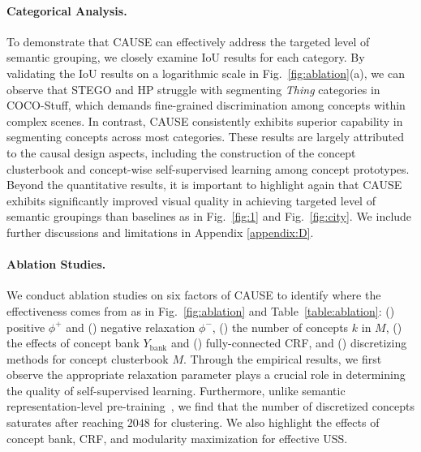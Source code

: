 \documentclass{article} \usepackage{iclr2024_conference,times}
\begin{document}
\paragraph{Categorical Analysis.} To demonstrate that CAUSE can effectively address the targeted level of semantic grouping, we closely examine IoU results for each category. By validating the IoU results on a logarithmic scale in Fig.~\ref{fig:ablation}(a), we can observe that STEGO and HP struggle with segmenting \textit{Thing} categories in COCO-Stuff, which demands fine-grained discrimination among concepts within complex scenes. In contrast, CAUSE consistently exhibits superior capability in segmenting concepts across most categories. These results are largely attributed to the causal design aspects, including the construction of the concept clusterbook and concept-wise self-supervised learning among concept prototypes. Beyond the quantitative results, it is important to highlight again that CAUSE exhibits significantly improved visual quality in achieving targeted level of semantic groupings than baselines as in Fig.~\ref{fig:1} and Fig.~\ref{fig:city}. We include further discussions and limitations in Appendix \ref{appendix:D}.


\paragraph{Ablation Studies.} We conduct ablation studies on six factors of CAUSE to identify where the effectiveness comes from as in Fig.~\ref{fig:ablation} and Table~\ref{table:ablation}: (\lowercase\expandafter{}) positive $\phi^{+}$ and (\lowercase\expandafter{}) negative relaxation $\phi^{-}$, (\lowercase\expandafter{}) the number of concepts $k$ in $M$, (\lowercase\expandafter{}) the effects of concept bank $Y_{\text{bank}}$ and (\lowercase\expandafter{}) fully-connected CRF, and (\lowercase\expandafter{}) discretizing methods for concept clusterbook $M$. Through the empirical results, we first observe the appropriate relaxation parameter plays a crucial role in determining the quality of self-supervised learning. Furthermore, unlike semantic representation-level pre-training~\citep{bao2022beit}, we find that the number of discretized concepts saturates after reaching $2048$ for clustering. We also highlight the effects of concept bank, CRF, and modularity maximization for effective USS. 
\end{document}
